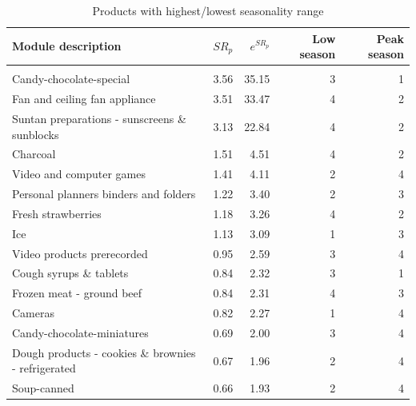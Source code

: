 \documentclass[]{article}
\begin{document}
\begin{table}

\caption{\label{tab:table_seasonality}Products with highest/lowest seasonality range}
\centering
\begin{tabular}[t]{lrrrr}
\toprule
Module description & $SR_p$ & $e^{SR_p}$ & Low season & Peak season\\
\midrule
\addlinespace[0.3em]
\multicolumn{5}{l}{\textbf{Highest $SR_p$}}\\
\hspace{1em}Candy-chocolate-special & 3.56 & 35.15 & 3 & 1\\
\hspace{1em}Fan and ceiling fan appliance & 3.51 & 33.47 & 4 & 2\\
\hspace{1em}Suntan preparations - sunscreens \& sunblocks & 3.13 & 22.84 & 4 & 2\\
\hspace{1em}Charcoal & 1.51 & 4.51 & 4 & 2\\
\hspace{1em}Video and computer games & 1.41 & 4.11 & 2 & 4\\
\hspace{1em}Personal planners binders and folders & 1.22 & 3.40 & 2 & 3\\
\hspace{1em}Fresh strawberries & 1.18 & 3.26 & 4 & 2\\
\hspace{1em}Ice & 1.13 & 3.09 & 1 & 3\\
\hspace{1em}Video products prerecorded & 0.95 & 2.59 & 3 & 4\\
\hspace{1em}Cough syrups \& tablets & 0.84 & 2.32 & 3 & 1\\
\hspace{1em}Frozen meat - ground beef & 0.84 & 2.31 & 4 & 3\\
\hspace{1em}Cameras & 0.82 & 2.27 & 1 & 4\\
\hspace{1em}Candy-chocolate-miniatures & 0.69 & 2.00 & 3 & 4\\
\hspace{1em}Dough products - cookies \& brownies - refrigerated & 0.67 & 1.96 & 2 & 4\\
\hspace{1em}Soup-canned & 0.66 & 1.93 & 2 & 4\\

\end{tabular}
\end{table}
\end{document}
